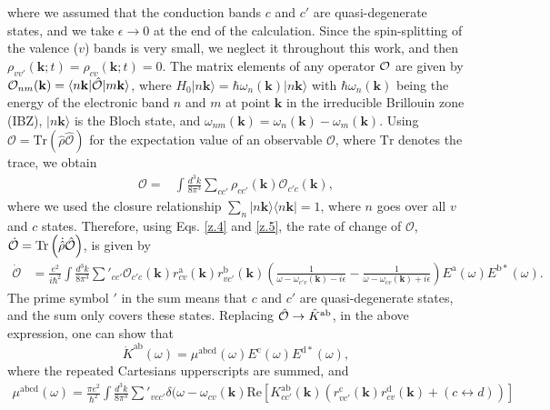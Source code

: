 \documentclass[floatfix,prb,aps,superscriptaddress,showpacs,11pt,preprint,letterpaper]{revtex4}
\begin{document}
where we assumed that the conduction bands $c$ and $c'$ are quasi-degenerate
states, and we take $\epsilon\to 0$ at the end of the calculation. Since the
spin-splitting of the valence ($v$) bands is very small, we neglect it
throughout this work,\cite{nastosPRB07} and then $\rho_{vv'}({\mathbf k};t)=
\rho_{cv}({\mathbf k};t) =0$. 
 The matrix elements of any operator ${\cal O}$ are
given by ${\cal O}_{nm}({\mathbf k})=\langle n{\mathbf k}|\hat{\cal O}|
m{\mathbf k}\rangle$, where $H_{0}|n{\mathbf k}\rangle = \hbar
\omega_{n}({\mathbf k})|n{\mathbf k}\rangle$ with $\hbar \omega_{n}({\mathbf
k})$ being the energy of the electronic band $n$ and $m$ at point ${\mathbf k}$
in the irreducible Brillouin zone (IBZ),  $|n{\mathbf k}\rangle$ is the Bloch
state, and $\omega_{nm}({\mathbf k})=\omega_{n}({\mathbf
k})-\omega_{m}({\mathbf k})$. Using $\mathcal{O} =
\mathrm{Tr}(\hat{\rho}\hat{\mathcal{O}})$ for the expectation value of an
observable $\mathcal{O}$, where $\mathrm{Tr}$ denotes the trace, we obtain
\begin{align}\label{z.5}
\mathcal{O} = & 
\int \frac{d^{3}k}{8\pi^{3}} \sum_{cc'} \rho_{cc'}({\mathbf k}) 
\mathcal{O}_{c'c}({\mathbf k}),
\end{align}
where we used the closure relationship $\sum_{n}|n{\mathbf k}\rangle \langle
n{\mathbf k}| = 1$, where $n$ goes over all $v$ and $c$ states.
Therefore, using  Eqs. \eqref{z.4}
and \eqref{z.5}, the rate of change of $\mathcal{O}$, $\dot{\mathcal{O}} =
\mathrm{Tr} \left( \dot{\hat\rho} \hat{\cal O} \right)$, is given by
\begin{align}
\dot{\mathcal{O}} 
&=\frac{e^{2}}{i\hbar^{2}} \int \frac{d^{3}k}{8\pi^{3}} 
\sum'_{cc'} \mathcal{O}_{c'c}({\mathbf k}) 
r^{\mathrm{a}}_{cv}({\mathbf k})  r^{\mathrm{b}}_{vc'}({\mathbf k})  
\left( \frac{1}{\omega - \omega_{c'v}({\mathbf k})  - i\epsilon} - 
\frac{1}{\omega - \omega_{cv}({\mathbf k})  + i\epsilon} \right)
E^{\mathrm{a}}(\omega) E^{\mathrm{b*}}(\omega)
\label{eq:dotO}
.
\end{align}
The prime symbol $'$ in the sum means that $c$ and $c'$ are quasi-degenerate
states, and the sum only covers these states. Replacing  $\hat{\cal O}
\rightarrow \hat{K}^{\mathrm{ab}}$, in the above expression, one can show that
\begin{equation}
\dot{K}^{\mathrm{ab}}(\omega) =
\mu^{\mathrm{abcd}}(\omega)
E^{\mathrm{c}}(\omega) E^{\mathrm{d*}}(\omega),
\label{eq:dotk}
\end{equation}
where the repeated Cartesians upperscripts  are summed, and 
\begin{equation}\label{eq:mu}
\begin{aligned}
\mu^{\mathrm{abcd}}  (\omega) 
=
\frac{\pi e^{2}}{\hbar^{2}} \int 
\frac{d^{3}k}{8 \pi^{3}} \sum'_{vcc'}
\delta(\omega-\omega_{cv}({\mathbf k}) 
\mathrm{Re} \left[ K^{\mathrm{ab}}_{cc'}({\mathbf k}) 
\left(  
r^{\mathrm{c}}_{vc'}({\mathbf k})   
r^{\mathrm{d}}_{cv }({\mathbf k})  +
(c \leftrightarrow d)  
\right) 
\right]
\end{aligned}
\end{equation} 
\end{document}
